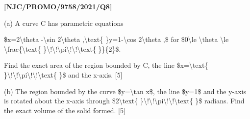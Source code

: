\item \textbf{{[}NJC/PROMO/9758/2021/Q8{]}} 

(a) A curve C has parametric equations

\$x=2\textbackslash theta -\textbackslash sin 2\textbackslash theta
,\textbackslash text\{ \}y=1-\textbackslash cos 2\textbackslash theta
,\$ for \$0\textbackslash le \textbackslash theta \textbackslash le
\textbackslash frac\{\textbackslash text\{ \}\textbackslash !\textbackslash !\textbackslash pi\textbackslash !\textbackslash !\textbackslash text\{
\}\}\{2\}\$.

Find the exact area of the region bounded by C, the line \$x=\textbackslash text\{
\}\textbackslash !\textbackslash !\textbackslash pi\textbackslash !\textbackslash !\textbackslash text\{
\}\$ and the x-axis. {[}5{]} 

(b) The region bounded by the curve \$y=\textbackslash tan x\$, the
line \$y=1\$ and the y-axis is rotated about the x-axis through \$2\textbackslash text\{
\}\textbackslash !\textbackslash !\textbackslash pi\textbackslash !\textbackslash !\textbackslash text\{
\}\$ radians. Find the exact volume of the solid formed. {[}5{]}